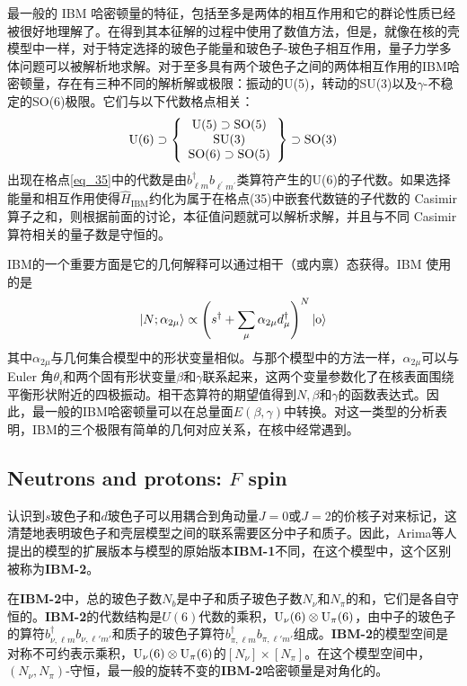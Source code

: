 最一般的 IBM 哈密顿量的特征，包括至多是两体的相互作用和它的群论性质已经被很好地理解了。在得到其本征解的过程中使用了数值方法，但是，就像在核的壳模型中一样，对于特定选择的玻色子能量和玻色子-玻色子相互作用，量子力学多体问题可以被解析地求解。对于至多具有两个玻色子之间的两体相互作用的IBM哈密顿量，存在有三种不同的解析解或极限：振动的U(5)，转动的SU(3)以及$\gamma$-不稳定的SO(6)极限。它们与以下代数格点相关：
\begin{equation}\label{eq_35}
{\rm U(6)}\supset\left\{\begin{array}{c}
{\rm U(5)}\supset{\rm SO(5)}\\
{\rm SU(3)}\\
{\rm SO(6)}\supset{\rm SO(5)}
\end{array}\right\}\supset{\rm SO(3)}
\end{equation}
出现在格点\ref{eq_35}中的代数是由$b_{\ell m}^\dagger b_{\ell^\prime m^\prime}$类算符产生的U(6)的子代数。如果选择能量和相互作用使得$\hat{H}_\textrm{IBM}$约化为属于在格点(35)中嵌套代数链的子代数的 Casimir 算子之和，则根据前面的讨论，本征值问题就可以解析求解，并且与不同 Casimir 算符相关的量子数是守恒的。

IBM的一个重要方面是它的几何解释可以通过相干（或内禀）态获得。IBM 使用的是
\begin{equation*}
|N;\alpha_{2\mu}\rangle\propto
\left(s^\dagger+\sum_\mu\alpha_{2\mu}d^\dagger_\mu\right)^N|{\rm o}\rangle
\end{equation*}
其中$\alpha_{2\mu}$与几何集合模型中的形状变量相似。与那个模型中的方法一样，$\alpha_{2\mu}$可以与 Euler 角$\theta_i$和两个固有形状变量$\beta$和$\gamma$联系起来，这两个变量参数化了在核表面围绕平衡形状附近的四极振动。相干态算符的期望值得到$N,\beta$和$\gamma$的函数表达式。因此，最一般的IBM哈密顿量可以在总量面$E(\beta,\gamma)$中转换。对这一类型的分析表明，IBM的三个极限有简单的几何对应关系，在核中经常遇到。

\subsection{Neutrons and protons: $F$ spin}

认识到$s$玻色子和$d$玻色子可以用耦合到角动量$J=0$或$J=2$的价核子对来标记，这清楚地表明玻色子和壳层模型之间的联系需要区分中子和质子。因此，Arima等人提出的模型的扩展版本与模型的原始版本\textbf{IBM-1}不同，在这个模型中，这个区别被称为\textbf{IBM-2}。

在\textbf{IBM-2}中，总的玻色子数$N_b$是中子和质子玻色子数$N_\nu$和$N_\pi$的和，它们是各自守恒的。\textbf{IBM-2}的代数结构是$U(6)$代数的乘积，${\rm U_\nu(6)\otimes U_\pi(6)}$，由中子的玻色子的算符$b^\dagger_{\nu,\ell m}b_{\nu,\ell'm'}$和质子的玻色子算符$b^\dagger_{\pi,\ell m}b_{\pi,\ell'm'}$组成。\textbf{IBM-2}的模型空间是对称不可约表示乘积，${\rm U}_\nu(6)\otimes{\rm U}_\pi(6)$的$[N_\nu]\times[N_\pi]$。在这个模型空间中，$(N_\nu,N_\pi)$-守恒，最一般的旋转不变的\textbf{IBM-2}哈密顿量是对角化的。


